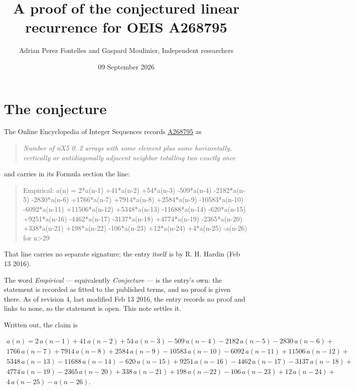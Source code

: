 \documentclass[11pt]{article}
\title{A proof of the conjectured linear recurrence for OEIS A268795}
\author{Adrian Perez Fontelles and Gaspard Moulinier, Independent researchers}
\date{09 September 2026}
\theoremstyle{definition}
\begin{document}
\maketitle
\section{The conjecture}

The Online Encyclopedia of Integer Sequences records \href{https://oeis.org/A268795}{A268795} as

\begin{quote}\itshape Number of nX5 0..2 arrays with some element plus some horizontally, vertically or antidiagonally adjacent neighbor totalling two exactly once\end{quote}

and carries in its Formula section the line:

\begin{quote}\ttfamily Empirical: a(n) = 2*a(n-1) +41*a(n-2) +54*a(n-3) -509*a(n-4) -2182*a(n-5) -2830*a(n-6) +1766*a(n-7) +7914*a(n-8) +2584*a(n-9) -10583*a(n-10) -6092*a(n-11) +11506*a(n-12) +5348*a(n-13) -11688*a(n-14) -620*a(n-15) +9251*a(n-16) -4462*a(n-17) -3137*a(n-18) +4774*a(n-19) -2365*a(n-20) +338*a(n-21) +198*a(n-22) -106*a(n-23) +12*a(n-24) +4*a(n-25) -a(n-26) for n>29\end{quote}

That line carries no separate signature; the entry itself is by R. H. Hardin (Feb 13 2016).

The word {\itshape Empirical} --- equivalently {\itshape Conjecture} --- is the entry's own: the statement is recorded as fitted to the published terms, and no proof is given there. As of revision 4, last modified Feb 13 2016, the entry records no proof and links to none, so the statement is open. This note settles it.

Written out, the claim is

\begin{multline*} a(n) = 2\,a(n-1) + 41\,a(n-2) + 54\,a(n-3) - 509\,a(n-4) - 2182\,a(n-5) - 2830\,a(n-6) + \\ 1766\,a(n-7) + 7914\,a(n-8) + 2584\,a(n-9) - 10583\,a(n-10) - 6092\,a(n-11) + 11506\,a(n-12) + \\ 5348\,a(n-13) - 11688\,a(n-14) - 620\,a(n-15) + 9251\,a(n-16) - 4462\,a(n-17) - 3137\,a(n-18) + \\ 4774\,a(n-19) - 2365\,a(n-20) + 338\,a(n-21) + 198\,a(n-22) - 106\,a(n-23) + 12\,a(n-24) + \\ 4\,a(n-25) - a(n-26). \end{multline*}
\end{document}
